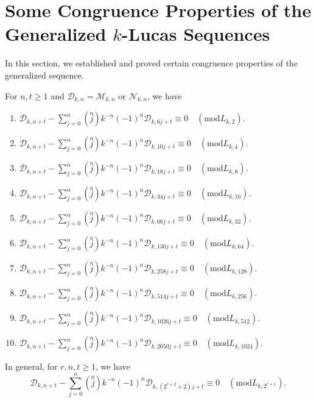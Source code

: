 \section{{Some Congruence Properties of the Generalized $k$-Lucas Sequences}}
In this section, we established and proved certain congruence properties of the generalized \kL\vspace{.5mm} sequence. 
\begin{theorem}For $n, t\geq 1$ and $\mathcal{D}_{k,n}=\mathcal{M}_{k,n}$ or $\mathcal{N}_{k,n}$, we have\label{5.1}
\begin{enumerate}
\item $\mathcal{D}_{k,n+t}-\sum\limits_{j=0}^{n}\left( \stackrel{n}{j}\right) k^{-n}(-1)^{n}\mathcal{D}_{k,6j+t}\equiv 0\quad (\text{mod} L_{k,2}) $.
\item $\mathcal{D}_{k,n+t}-\sum\limits_{j=0}^{n}\left( \stackrel{n}{j}\right) k^{-n}(-1)^{n}\mathcal{D}_{k,10j+t}\equiv 0\quad (\text{mod} L_{k,4}) $.
\item $\mathcal{D}_{k,n+t}-\sum\limits_{j=0}^{n}\left( \stackrel{n}{j}\right) k^{-n}(-1)^{n}\mathcal{D}_{k,18j+t}\equiv 0\quad (\text{mod} L_{k,8}) $.
\item $\mathcal{D}_{k,n+t}-\sum\limits_{j=0}^{n}\left( \stackrel{n}{j}\right) k^{-n}(-1)^{n}\mathcal{D}_{k,34j+t}\equiv 0\quad (\text{mod} L_{k,16}) $.
\item $\mathcal{D}_{k,n+t}-\sum\limits_{j=0}^{n}\left( \stackrel{n}{j}\right) k^{-n}(-1)^{n}\mathcal{D}_{k,66j+t}\equiv 0\quad (\text{mod} L_{k,32}) $.
\item $\mathcal{D}_{k,n+t}-\sum\limits_{j=0}^{n}\left( \stackrel{n}{j}\right) k^{-n}(-1)^{n}\mathcal{D}_{k,130j+t}\equiv 0\quad (\text{mod} L_{k,64}) $.
\item $\mathcal{D}_{k,n+t}-\sum\limits_{j=0}^{n}\left( \stackrel{n}{j}\right) k^{-n}(-1)^{n}\mathcal{D}_{k,258j+t}\equiv 0\quad (\text{mod} L_{k,128}) $.
\item $\mathcal{D}_{k,n+t}-\sum\limits_{j=0}^{n}\left( \stackrel{n}{j}\right) k^{-n}(-1)^{n}\mathcal{D}_{k,514j+t}\equiv 0\quad (\text{mod} L_{k,256}) $.
\item $\mathcal{D}_{k,n+t}-\sum\limits_{j=0}^{n}\left( \stackrel{n}{j}\right) k^{-n}(-1)^{n}\mathcal{D}_{k,1026j+t}\equiv 0\quad (\text{mod} L_{k,512}) $.
\item $\mathcal{D}_{k,n+t}-\sum\limits_{j=0}^{n}\left( \stackrel{n}{j}\right) k^{-n}(-1)^{n}\mathcal{D}_{k,2050j+t}\equiv 0\quad (\text{mod} L_{k,1024}) $.
\end{enumerate}
In general, for $r, n,t\geq 1$, we have
$$\mathcal{D}_{k,n+t}-\sum\limits_{j=0}^{n}\left( \stackrel{n}{j}\right) k^{-n}(-1)^{n}\mathcal{D}_{k,(2^{r+2}+2)j+t} \equiv 0\quad (\text{mod} {L_{k,2^{r+1}}}). $$
\end{theorem}

